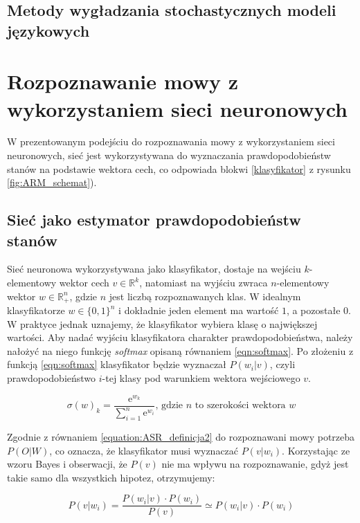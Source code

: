 \documentclass[11pt]{article}
\newcommand{\refBlock}[1]{%
	\hyperref[#1]{\ref*{#1}}%
}
\begin{document}
    \subsection{ Metody wygładzania stochastycznych modeli językowych }


\section{Rozpoznawanie mowy z wykorzystaniem sieci neuronowych}
	\label{sec:ASR_NN}
	W prezentowanym podejściu do rozpoznawania mowy z wykorzystaniem sieci neuronowych, sieć jest wykorzystywana do wyznaczania prawdopodobieństw stanów na podstawie wektora cech, co odpowiada blokwi \refBlock{klasyfikator} z rysunku \ref{fig:ARM_schemat}).
	
	\subsection{Sieć jako estymator prawdopodobieństw stanów }
	\label{sec:nn_estymator}
		Sieć neuronowa wykorzystywana jako klasyfikator, dostaje na wejściu $k$-elementowy wektor cech $v \in \mathbb{R}^k$, natomiast na wyjściu zwraca $n$-elementowy wektor $w \in \mathbb{R}_+^n$, gdzie $n$ jest liczbą rozpoznawanych klas. W idealnym klasyfikatorze $w \in \{0,1\}^n$ i dokładnie jeden element ma wartość $1$, a pozostałe $0$. W praktyce jednak uznajemy, że klasyfikator wybiera klasę o największej wartości. Aby nadać wyjściu klasyfikatora charakter prawdopodobieństwa, należy nałożyć na niego funkcję \textit{softmax} opisaną równaniem \ref{eqn:softmax}. Po złożeniu z funkcją \ref{eqn:softmax} klasyfikator będzie wyznaczał $P(w_i|v)$, czyli prawdopodobieństwo $i$-tej klasy pod warunkiem wektora wejściowego $v$.
		
		\begin{equation}
			\sigma(w)_k=\frac{\mathrm{e}^{w_k}}{\sum_{i=1}^{n} \mathrm{e}^{w_i}}
			\text{,   gdzie $n$ to szerokości wektora $w$}
			\label{eqn:softmax}
		\end{equation}
		
		Zgodnie z równaniem \ref{equation:ASR_definicja2} do rozpoznawani mowy potrzeba $P(O|W)$, co oznacza, że klasyfikator musi wyznaczać $P(v|w_i)$. Korzystając ze wzoru Bayes i obserwacji, że $P(v)$ nie ma wpływu na rozpoznawanie, gdyż jest takie samo dla wszystkich hipotez, otrzymujemy:
		
		\begin{equation}
			P(v|w_i) = \frac{P(w_i|v) \cdot P(w_i)}{P(v)}\simeq P(w_i|v) \cdot P(w_i)
			\label{eqn:softmax2}
		\end{equation}
		
\end{document}
